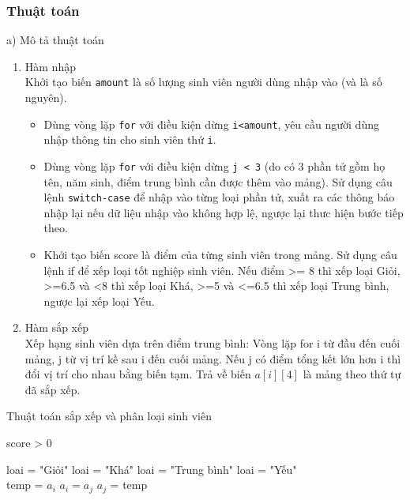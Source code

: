 \documentclass[a4paper]{article}
\begin{document}
\subsubsection{Thuật toán}
a) Mô tả thuật toán\\
\begin{enumerate}
    \item Hàm nhập\\
    Khởi tạo biến \texttt{amount} là số lượng sinh viên người dùng nhập vào (và là số nguyên).
    \begin{itemize}
        \item Dùng vòng lặp \texttt{for} với điều kiện dừng \texttt{i<amount}, yêu cầu người dùng nhập thông tin cho sinh viên thứ \texttt{i}.
        \item Dùng vòng lặp \texttt{for} với điều kiện dừng \texttt{j < 3} (do có 3 phần tử gồm họ tên, năm sinh, điểm trung bình cần được thêm vào mảng). Sử dụng câu lệnh \texttt{switch-case} để nhập vào từng loại phần tử, xuất ra các thông báo nhập lại nếu dữ liệu nhập vào không hợp lệ, ngược lại thưc hiện bước tiếp theo.
        \item Khởi tạo biến score là điểm của từng sinh viên trong mảng. Sử dụng câu lệnh if để xếp loại tốt nghiệp sinh viên. Nếu điểm >= 8 thì xếp loại Giỏi, >=6.5 và <8 thì xếp loại Khá, >=5 và <=6.5 thì xếp loại Trung bình, ngược lại xếp loại Yếu.
    \end{itemize}
    \item Hàm sắp xếp\\
    Xếp hạng sinh viên dựa trên điểm trung bình:
    Vòng lặp for i từ đầu đến cuối mảng, j từ vị trí kề sau i đến cuối mảng. Nếu j có điểm tổng kết lớn hơn i thì đổi vị trí cho nhau bằng biến tạm. Trả về biến $a[i][4]$ là mảng theo thứ tự đã sắp xếp.
\end{enumerate}

\begin{algorithm}
\caption{Thuật toán sắp xếp và phân loại sinh viên}\label{alg:cap}
\begin{algorithmic}
\Require score > 0

    \State loai = "Giỏi"
    \State loai = "Khá"
    \State loai = "Trung bình"
\Else
    \State loai = "Yếu"
\EndIf\\

            \State temp = $a_{i}$
            \State $a_{i} = a_{j}$
            \State $a_{j}$ = temp
        \EndIf
    \EndFor
\EndFor
\end{algorithmic}
\end{algorithm}
\end{document}
